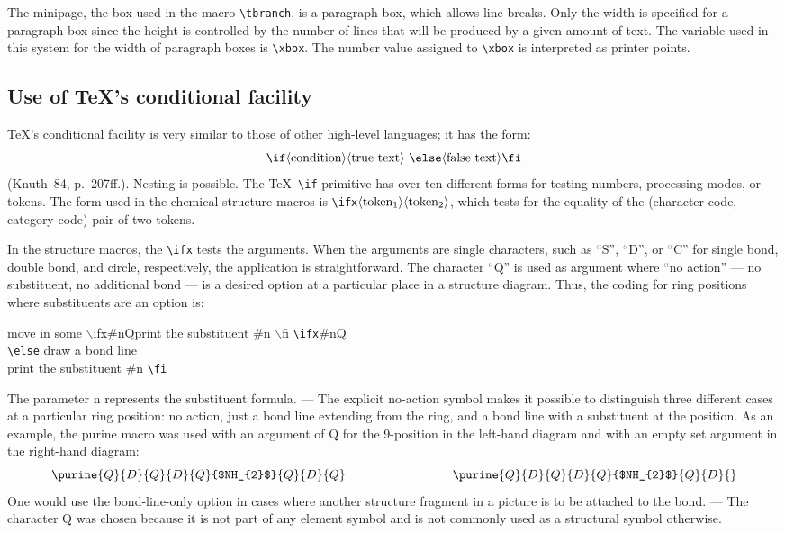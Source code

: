 The minipage, the box used in the macro \verb+\tbranch+,
 is a paragraph box, which allows line breaks. Only the width
 is specified for a paragraph box since the height is
 controlled by the number of lines that will be produced by
 a given amount of text. The variable used in this system
 for the width of paragraph boxes is \verb+\xbox+. The number
 value assigned to \verb+\xbox+ is interpreted as printer
 points.
 
\subsection{Use of \TeX's conditional facility}
 \TeX's conditional facility is very similar to those of other
 high-level languages; it has the form:
 $$\hbox
 {\verb+\if+\(\langle\)condition\(\rangle\langle\)true text\(\rangle\)
  \verb+\else+\(\langle\)false text\(\rangle\)\verb+\fi+}
 $$
 (Knuth~84, p.~207ff.).  Nesting is possible.
 The \TeX\  \verb+\if+ primitive has over ten different forms
 for testing numbers, processing modes, or tokens.
 The form used in the chemical structure macros is
 \verb+\ifx+${\rm \langle token_{1}\rangle \langle
 token_{2}\rangle}$, which tests for the equality of the
 (character code, category code) pair of two tokens.
 
 In the structure macros, the \verb+\ifx+ tests the
 arguments. When the arguments are single characters,
 such as ``S'', ``D'', or ``C'' for single bond, double
 bond, and circle, respectively, the application is
 straightforward.  The character ``Q'' is used as argument
 where ``no action'' --- no substituent, no additional bond
 --- is a desired option at a particular place in a structure
 diagram. Thus, the coding for ring positions where substituents
 are an option is:
 
 \begin{tabbing}
  move in some\= $\backslash $ifx\#nQ\= print the substituent \#n
                                        $\backslash $fi\+ \kill
                 \verb+\ifx+\#nQ\>                           \\
                 \verb+\else+   \> draw a bond line \+  \\
                 print the substituent \#n \verb+\fi+
  \end{tabbing}
 
 The parameter n represents the substituent formula. ---
 The explicit no-action symbol makes it possible to distinguish
 three different cases at a particular ring position: no action,
 just a bond line extending from the ring, and a bond line with
 a substituent at the position. As an example, the purine macro
 was used with an argument of Q for the 9-position in the
 left-hand diagram and with an empty set argument in the
 right-hand diagram:
 \[ \purine{Q}{D}{Q}{D}{Q}{$NH_{2}$}{Q}{D}{Q}
    \hspace{3cm}\purine{Q}{D}{Q}{D}{Q}{$NH_{2}$}{Q}{D}{}  \]
 One would use the bond-line-only option in cases where another
 structure fragment in a picture is to be attached to the bond.
 --- The character Q was chosen because it is not part of any
 element symbol and is not commonly used as a structural symbol
 otherwise.
 
